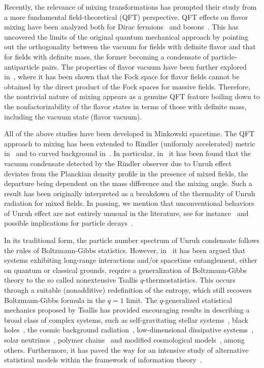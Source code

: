\documentclass[floats,prd,aps,amssymb,nofootinbib,showkeys]{revtex4}
\begin{document}
Recently, the relevance of mixing transformations 
has prompted their study from a more fundamental
field-theoretical (QFT) perspective. QFT effects on flavor mixing have been analyzed both for Dirac fermions~\cite{BV95} and bosons~\cite{BlasCap}. This has uncovered the limits of the
original quantum mechanical approach by pointing out the orthogonality 
between the vacuum for fields with definite flavor and that for fields with definite mass, the former becoming a condensate
of particle-antiparticle pairs.
The properties of flavor vacuum
have been further explored in~\cite{Cabo}, where
it has been shown that the Fock space for flavor fields cannot be obtained 
by the direct product of the Fock spaces for massive
fields. Therefore, the nontrivial nature of mixing
appears as a genuine QFT feature boiling down to the 
nonfactorizability of the flavor states in terms
of those with definite mass, including the vacuum state (flavor vacuum). 


All of the above studies have been developed in
Minkowski spacetime. The QFT approach
to mixing has been extended to 
Rindler (uniformly accelerated) metric in~\cite{Luciano,NonTN}
and to curved background in~\cite{Quaranta}.
In particular, in~\cite{Luciano,NonTN} it has been
found that the vacuum condensate detected by the 
Rindler observer due to Unruh effect~\cite{Unruh}
deviates from the Planckian density profile
in the presence of mixed fields, the departure being dependent 
on the mass difference and the mixing angle. Such a result
has been originally interpreted as a breakdown of the thermality of Unruh radiation 
for mixed fields. In passing, we mention that 
unconventional behaviors of Unruh effect are 
not entirely unusual in the literature, see for instance~\cite{Dop,Hammad,deformed1,deformedPet} and possible
implications for particle decays~\cite{Decay1,Decay2,Decay3}.  

In its traditional form, the particle number spectrum 
of Unruh condensate follows 
the rules of Boltzmann-Gibbs
statistics. However, in~\cite{Tsallis1,Tsallis2,Tsallis3,Tsallis4}
it has been argued that systems exhibiting long-range
interactions and/or spacetime entanglement, either on quantum or classical grounds, require a
generalization of Boltzmann-Gibbs theory to the so called 
nonextensive Tsallis $q$-thermostatistics.
This occurs through a suitable
(nonadditive) redefinition of the entropy, which still
recovers Boltzmann-Gibbs formula in the $q=1$ limit.    
The $q$-generalized statistical mechanics proposed
by Tsallis has provided encouraging results in
describing a broad class of complex systems, such as
self-gravitating stellar systems~\cite{App1,App3}, black holes~\cite{Tsallis3}, the cosmic background radiation~\cite{App7,App8}, 
low-dimensional dissipative systems~\cite{Tsallis4}, solar neutrinos~\cite{App11}, polymer chains~\cite{Polch} and modified cosmological models~\cite{App13,App14}, among others. Furthermore, it has paved the way 
for an intensive study of alternative statistical models within the framework of information theory~\cite{Ren}.
\end{document}
